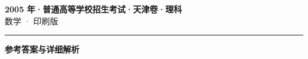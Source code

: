 \documentclass[zihao=5, a4paper]{ctexart}
\begin{document}
\begin{center}
  {\Large\bfseries 2005 年·普通高等学校招生考试·天津卷·理科}\\[4pt]
  {\large 数学 · 印刷版}
\end{center}
\medskip
{}

\par\bigskip\hrule\bigskip
{}
\begin{center}{\large\bfseries 参考答案与详细解析}\end{center}
\smallskip

\end{document}
